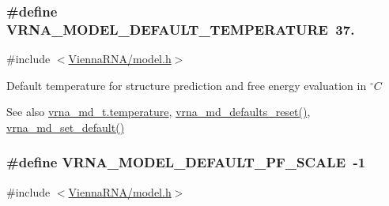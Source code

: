 \subsubsection[{\texorpdfstring{V\+R\+N\+A\+\_\+\+M\+O\+D\+E\+L\+\_\+\+D\+E\+F\+A\+U\+L\+T\+\_\+\+T\+E\+M\+P\+E\+R\+A\+T\+U\+RE}{VRNA_MODEL_DEFAULT_TEMPERATURE}}]{\setlength{\rightskip}{0pt plus 5cm}\#define V\+R\+N\+A\+\_\+\+M\+O\+D\+E\+L\+\_\+\+D\+E\+F\+A\+U\+L\+T\+\_\+\+T\+E\+M\+P\+E\+R\+A\+T\+U\+RE~37.}\hypertarget{group__model__details_gaf47f9850b3b4763479f7a7e7a15648a2}{}\label{group__model__details_gaf47f9850b3b4763479f7a7e7a15648a2}


{\ttfamily \#include $<$\hyperlink{model_8h}{Vienna\+R\+N\+A/model.\+h}$>$}



  Default temperature for structure prediction and free energy evaluation in $^\circ C$  

\begin{DoxySeeAlso}{See also}
\hyperlink{structvrna__md__s_a5f7e5c2b65bada5188443470e576aa4b}{vrna\+\_\+md\+\_\+t.\+temperature}, \hyperlink{group__model__details_ga70834424cf804d149937de89f80ceb45}{vrna\+\_\+md\+\_\+defaults\+\_\+reset()}, \hyperlink{group__model__details_ga8ac6ff84936282436f822644bf841f66}{vrna\+\_\+md\+\_\+set\+\_\+default()} 
\end{DoxySeeAlso}
\subsubsection[{\texorpdfstring{V\+R\+N\+A\+\_\+\+M\+O\+D\+E\+L\+\_\+\+D\+E\+F\+A\+U\+L\+T\+\_\+\+P\+F\+\_\+\+S\+C\+A\+LE}{VRNA_MODEL_DEFAULT_PF_SCALE}}]{\setlength{\rightskip}{0pt plus 5cm}\#define V\+R\+N\+A\+\_\+\+M\+O\+D\+E\+L\+\_\+\+D\+E\+F\+A\+U\+L\+T\+\_\+\+P\+F\+\_\+\+S\+C\+A\+LE~-\/1}\hypertarget{group__model__details_ga5505389cba74a18bbc116d2bb20256fa}{}\label{group__model__details_ga5505389cba74a18bbc116d2bb20256fa}


{\ttfamily \#include $<$\hyperlink{model_8h}{Vienna\+R\+N\+A/model.\+h}$>$}



